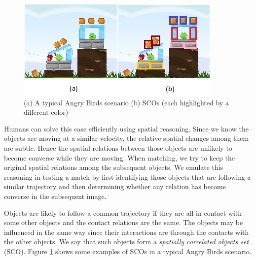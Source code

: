 \documentclass[letterpaper]{article}
\begin{document}
\begin{figure}[t]
\centering\includegraphics[scale=0.55]{SCOScenario.png}
\vspace{-3mm}
\caption{(a) A typical Angry Birds scenario (b) SCOs (each highlighted by a different color)}
\label{SCOExample}
\vspace{-4mm}
\end{figure}

Humans can solve this case efficiently using spatial reasoning. Since we know the objects are moving at a similar velocity, the relative spatial changes among them are subtle. Hence the spatial relations between those objects are unlikely to become converse while they are moving. When matching, we try to keep the original spatial relations among the subsequent objects. We emulate this reasoning in testing a match by first identifying those objects that are following a similar trajectory and then determining whether any relation has become converse in the subsequent image. 

Objects are likely to follow a common trajectory if they are all in contact with some other objects and the contact relations are the same. The objects may be influenced in the same way since their interactions are through the contacts with the other objects. We say that such objects form a \emph{spatially correlated objects set} (SCO). Figure \ref{SCOExample} shows some examples of SCOs in a typical Angry Birds scenario.
\end{document}
